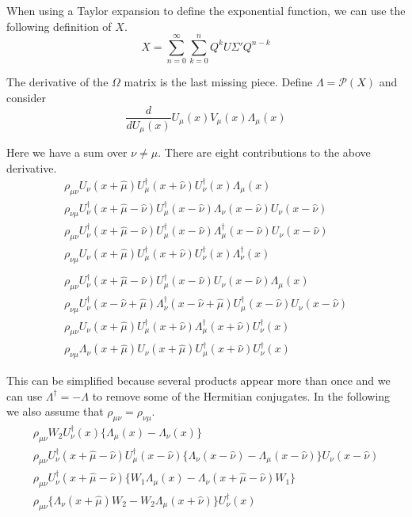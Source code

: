 \documentclass[12pt]{article}
\newcommand{\cP}{\mathcal{P}}
\begin{document}
When using a Taylor expansion to define the exponential function, we can use the following definition of $X$.
\begin{equation}
 X = \sum_{n=0}^\infty\sum_{k=0}^n Q^kU\Sigma' Q^{n-k}
\end{equation}

The derivative of the $\Omega$ matrix is the last missing piece. Define $\Lambda=\cP(X)$ and consider
\begin{equation}
 \frac{d}{d U_\mu(x)} U_\mu(x)V_\mu(x)\Lambda_\mu(x)
\end{equation}

Here we have a sum over $\nu\neq\mu$. There are eight contributions to the above derivative.
\begin{align}
 \rho_{\mu\nu}U_\nu(x+\hat{\mu})U_\mu^\dagger(x+\hat{\nu})U_\nu^\dagger(x)\Lambda_\mu(x) \\
 \rho_{\nu\mu}U_\nu^\dagger(x+\hat{\mu}-\hat{\nu})U_\mu^\dagger(x-\hat{\nu})\Lambda_\nu(x-\hat{\nu})U_\nu(x-\hat{\nu}) \\
 \rho_{\mu\nu}U_\nu^\dagger(x+\hat{\mu}-\hat{\nu})U_\mu^\dagger(x-\hat{\nu})\Lambda_\mu^\dagger(x-\hat{\nu})U_\nu(x-\hat{\nu}) \\
 \rho_{\nu\mu}U_\nu(x+\hat{\mu})U_\mu^\dagger(x+\hat{\nu})U_\nu^\dagger(x)\Lambda_\nu^\dagger(x) \\
 \nonumber\\
 \rho_{\mu\nu}U_\nu^\dagger(x+\hat{\mu}-\hat{\nu})U_\mu^\dagger(x-\hat{\nu})U_\nu(x-\hat{\nu})\Lambda_\mu(x) \\
 \rho_{\nu\mu}U_\nu^\dagger(x-\hat{\nu}+\hat{\mu})\Lambda_\nu^\dagger(x-\hat{\nu}+\hat{\mu})U_\mu^\dagger(x-\hat{\nu})U_\nu(x-\hat{\nu}) \\
 \rho_{\mu\nu}U_\nu(x+\hat{\mu})U_\mu^\dagger(x+\hat{\nu})\Lambda_\mu^\dagger(x+\hat{\nu})U_\nu^\dagger(x) \\
 \rho_{\nu\mu}\Lambda_\nu(x+\hat{\mu})U_\nu(x+\hat{\mu})U_\mu^\dagger(x+\hat{\nu})U_\nu^\dagger(x)
\end{align}

This can be simplified because several products appear more than once and we can use $\Lambda^\dagger=-\Lambda$ to remove some of the Hermitian conjugates. In the following we also assume that $\rho_{\mu\nu}=\rho_{\nu\mu}$.
\begin{align}
 \rho_{\mu\nu}W_2U_\nu^\dagger(x)\{\Lambda_\mu(x)-\Lambda_\nu(x)\} \\
 \rho_{\mu\nu}U_\nu^\dagger(x+\hat{\mu}-\hat{\nu})U_\mu^\dagger(x-\hat{\nu})\{\Lambda_\nu(x-\hat{\nu})-\Lambda_\mu(x-\hat{\nu})\}U_\nu(x-\hat{\nu}) \\
 \rho_{\mu\nu}U_\nu^\dagger(x+\hat{\mu}-\hat{\nu})\{W_1\Lambda_\mu(x)-\Lambda_\nu(x+\hat{\mu}-\hat{\nu})W_1\} \\
 \rho_{\mu\nu}\{\Lambda_\nu(x+\hat{\mu})W_2-W_2\Lambda_\mu(x+\hat{\nu})\}U_\nu^\dagger(x)
\end{align}
\end{document}
